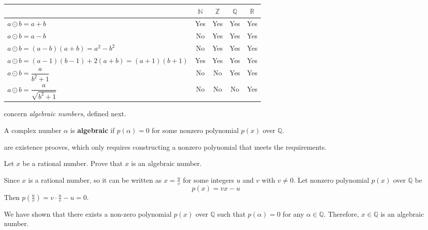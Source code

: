 \begin{mysolution}
    \fixlistskip
    \begin{center}
    \begin{tabular}{| l | c | c | c | c |}
        \hline
         & $\mathbb{N}$ & $\mathbb{Z}$ & $\mathbb{Q}$ & $\mathbb{R}$ \\
        \hline
        $a \odot b = a + b$ & Yes & Yes & Yes & Yes \\
        \hline
        $a \odot b = a - b$ & No & Yes & Yes & Yes \\
        \hline
        $a \odot b = (a-b)(a+b)=a^2-b^2$ & No & Yes & Yes & Yes \\
        \hline
        $a \odot b = (a-1)(b-1) + 2(a+b)=(a+1)(b+1)$ & Yes & Yes & Yes & Yes \\
        \hline
        $a \odot b = \dfrac{a}{b^2+1}$ & No & No & Yes & Yes \\
        \hline
        $a \odot b = \dfrac{a}{\sqrt{b^2+1}}$ & No & No & No & Yes \\
        \hline
    \end{tabular}
    \end{center}
\end{mysolution}

 concern \textit{algebraic numbers}, defined next.

\begin{definition}
\label{defAlgebraicNumber}
A complex number $\alpha$ is \textbf{algebraic} if $p(\alpha) = 0$ for some nonzero polynomial $p(x)$ over $\mathbb{Q}$.
\end{definition}

\begin{mysolution}
     are existence prooves, which only requires constructing a nonzero polynomial that meets the requirements.
\end{mysolution}

\begin{chapex}
\label{cqAlgebraicNumbersBegin}
Let $x$ be a rational number. Prove that $x$ is an algebraic number.
\end{chapex}

\begin{myproof}
    Since $x$ is a rational number, so it can be written as $x = \frac{u}{v}$ for some integers $u$ and $v$ with $v \ne 0$. Let nonzero polynomial $p(x)$ over $\mathbb{Q}$ be
    \[
    p(x) = vx - u
    \]
    Then $p(\frac{u}{v}) = v \cdot \frac{u}{v}-u = 0$. 
    
    We have shown that there exists a non-zero polynomial $p(x)$ over $\mathbb{Q}$ such that $p(\alpha) = 0$ for any $\alpha \in \mathbb{Q}$. Therefore, $x \in \mathbb{Q}$ is an algebraic number.
\end{myproof}

